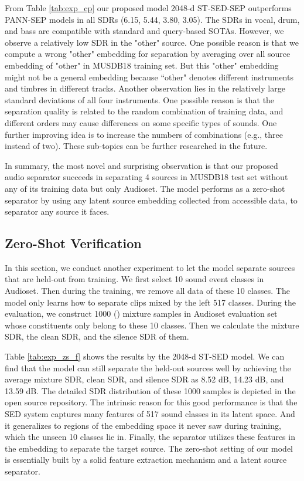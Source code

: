 \documentclass[letterpaper]{article} \usepackage{aaai22}  \usepackage{times}  \usepackage{helvet}  \usepackage{courier}  \usepackage[hyphens]{url}  \usepackage{graphicx} \urlstyle{rm} \def\UrlFont{\rm}  \usepackage{natbib}  \usepackage{caption} \DeclareCaptionStyle{ruled}{labelfont=normalfont,labelsep=colon,strut=off} \frenchspacing  \setlength{\pdfpagewidth}{8.5in}  \setlength{\pdfpageheight}{11in}  \usepackage{algorithm}
\begin{document}
From Table \ref{tab:exp_cp} our proposed model 2048-d ST-SED-SEP outperforms PANN-SEP models in all SDRs (6.15, 5.44, 3.80, 3.05). The SDRs in vocal, drum, and bass are compatible with standard and query-based SOTAs. However, we observe a relatively low SDR in the "other" source. One possible reason is that we compute a wrong "other" embedding for separation by averaging over all source embedding of "other" in MUSDB18 training set. But this "other" embedding might not be a general embedding because “other" denotes different instruments and timbres in different tracks. Another observation lies in the relatively large standard deviations of all four instruments. One possible reason is that the separation quality is related to the random combination of training data, and different orders may cause differences on some specific types of sounds. One further improving idea is to increase the numbers of combinations (e.g., three instead of two). These sub-topics can be further researched in the future.

In summary, the most novel and surprising observation is that our proposed audio separator succeeds in separating 4 sources in MUSDB18 test set without any of its training data but only Audioset. The model performs as a zero-shot separator by using any latent source embedding collected from accessible data, to separator any source it faces.

\subsection{Zero-Shot Verification}
In this section, we conduct another experiment to let the model separate sources that are held-out from training. We first select 10 sound event classes in Audioset. Then during the training, we remove all data of these 10 classes. The model only learns how to separate clips mixed by the left 517 classes. During the evaluation, we construct 1000 () mixture samples in Audioset evaluation set whose constituents only belong to these 10 classes. Then we calculate the mixture SDR, the clean SDR, and the silence SDR of them. 

Table \ref{tab:exp_zs_f} shows the results by the 2048-d ST-SED model. We can find that the model can still separate the held-out sources well by achieving the average mixture SDR, clean SDR, and silence SDR as 8.52 dB, 14.23 dB, and 13.59 dB. The detailed SDR distribution of these 1000 samples is depicted in the open source repository. The intrinsic reason for this good performance is that the SED system captures many features of 517 sound classes in its latent space. And it generalizes to regions of the embedding space it never saw during training, which the unseen 10 classes lie in. Finally, the separator utilizes these features in the embedding to separate the target source. The zero-shot setting of our model is essentially built by a solid feature extraction mechanism and a latent source separator.
\end{document}
